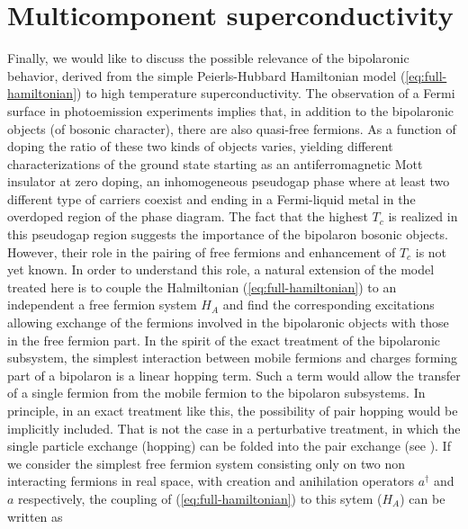 \section{Multicomponent superconductivity}
\label{sec:multiSuperc}

Finally, we would like to discuss the possible relevance of the bipolaronic behavior, derived from the simple Peierls-Hubbard Hamiltonian model (\ref{eq:full-hamiltonian}) to high temperature superconductivity. 
The observation of a Fermi surface in photoemission experiments \cite{Ding1996,Hussey2003} implies that, in addition to the bipolaronic objects (of bosonic character), there are also quasi-free fermions. 
As a function of doping the ratio of these two kinds of objects varies, yielding different characterizations of the ground state starting as an antiferromagnetic Mott insulator at zero doping, an inhomogeneous pseudogap phase where at least two different type of carriers coexist and ending in a Fermi-liquid metal in the overdoped region of the phase diagram. 
The fact that the highest $T_c$  is realized in this pseudogap region suggests the importance of the bipolaron bosonic objects. 
However, their role in the pairing of free fermions and enhancement of $T_c$ is not yet known. 
In order to understand this role, a natural extension of the model treated here is to couple the Halmiltonian  (\ref{eq:full-hamiltonian}) to an independent a free fermion system $H_A$ and find the corresponding excitations allowing exchange of the fermions involved in the bipolaronic objects with those in the free fermion part. 
In the spirit of the exact treatment of the bipolaronic subsystem, the simplest interaction between mobile fermions and charges forming part of a bipolaron is a linear hopping term. 
Such a term would allow the transfer of a single fermion from the mobile fermion to the bipolaron subsystems. 
In principle, in an exact treatment like this, the possibility of pair hopping would be implicitly included. 
That is not the case in a perturbative treatment, in which the single particle exchange (hopping) can be folded into the pair exchange (see \cite{Bar-Yam1991}).
If we consider the simplest free fermion system consisting only on two non interacting fermions in real space, with creation and anihilation operators $a^\dagger$ and $a$ respectively, the coupling of (\ref{eq:full-hamiltonian}) to this sytem ($H_A$) can be written as

